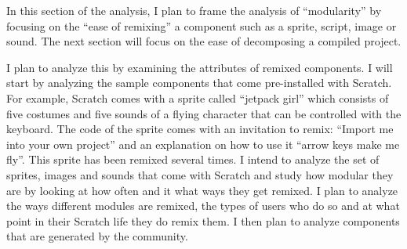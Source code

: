 In this section of the analysis, I plan to frame the analysis of ``modularity'' by focusing on the ``ease of remixing'' a component such as a sprite, script, image or sound. 
The next section will focus on the ease of decomposing a compiled project.

I plan to analyze this by examining the attributes of remixed components. 
I will start by analyzing the sample components that come pre-installed with Scratch.
For example, Scratch comes with a sprite called ``jetpack girl'' which consists of five costumes and five sounds of a flying character that can be controlled with the keyboard.
The code of the sprite comes with an invitation to remix: ``Import me into your own project'' and an explanation on how to use it ``arrow keys make me fly''.
This sprite has been remixed several times.
I intend to analyze the set of sprites, images and sounds that come with Scratch and study how modular they are by looking at how often and it what ways they get remixed.
I plan to analyze the ways different modules are remixed, the types of users who do so and at what point in their Scratch life they do remix them.
I then plan to analyze components that are generated by the community.


%
%

